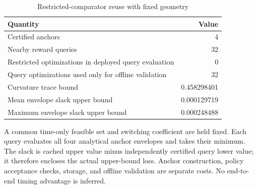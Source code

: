 \begin{table}[htbp]
\centering\small
\caption{Restricted-comparator reuse with fixed geometry}\label{tab:cache}
\begin{tabular}{lr}
\toprule
Quantity & Value \\ \midrule
Certified anchors & 4 \\
Nearby reward queries & 32 \\
Restricted optimizations in deployed query evaluation & 0 \\
Query optimizations used only for offline validation & 32 \\
Curvature trace bound & 0.458298401 \\
Mean envelope slack upper bound & 0.000129719 \\
Maximum envelope slack upper bound & 0.000248488 \\
\bottomrule
\end{tabular}
\par\smallskip
\begin{minipage}{.98\textwidth}\footnotesize A common time-only feasible set and switching coefficient are held fixed. Each query evaluates all four analytical anchor envelopes and takes their minimum. The slack is cached upper value minus independently certified query lower value; it therefore encloses the actual upper-bound loss. Anchor construction, policy acceptance checks, storage, and offline validation are separate costs. No end-to-end timing advantage is inferred.\end{minipage}
\end{table}
